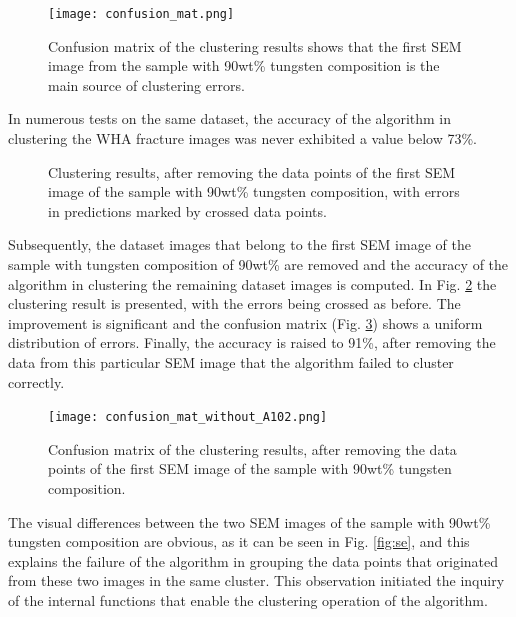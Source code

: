 \documentclass[authoryear,preprint,review,12pt, singleside]{elsarticle}
\begin{document}
 
\begin{figure}[!h]
	\centering
	\texttt{[image: confusion\_mat.png]}
	\caption{Confusion matrix of the clustering results shows that the first SEM image from the sample with 90wt\% tungsten composition is the main source of clustering errors.}
	\label{fig:confusion_mat}
\end{figure} 

In numerous tests on the same dataset, the accuracy of the algorithm in clustering the WHA fracture images was never exhibited a value below 73\%.


\begin{figure}[!h]
	\centering
	\caption{Clustering results, after removing the data points of the first SEM image of the sample with 90wt\% tungsten composition, with errors in predictions marked by crossed data points.}
	\label{fig:cluster_result_errors2}
\end{figure}


Subsequently, the dataset images that belong to the first SEM image of the sample with tungsten composition of 90wt\% are removed and the accuracy of the algorithm in clustering the remaining dataset images  is computed. In Fig. \ref{fig:cluster_result_errors2} the clustering result is presented, with the errors being crossed as before. The improvement is significant and the confusion matrix (Fig. \ref{fig:confusion_mat2}) shows a uniform distribution of errors. Finally, the accuracy is raised to 91\%, after removing the data from this particular SEM image that the algorithm failed to cluster correctly. 

\begin{figure}[!h]
	\centering
	\texttt{[image: confusion\_mat\_without\_A102.png]}
	\caption{Confusion matrix of the clustering results, after removing the data points of the first SEM image of the sample with 90wt\% tungsten composition.}
	\label{fig:confusion_mat2}
\end{figure} 

The visual differences between the two SEM images of the sample with 90wt\% tungsten composition are obvious, as it can be seen in Fig. \ref{fig:se}, and this explains the failure of the algorithm in grouping the data points that originated from these two images in the same cluster. This observation initiated the inquiry of the internal functions that enable the clustering operation of the algorithm. 
\end{document}
